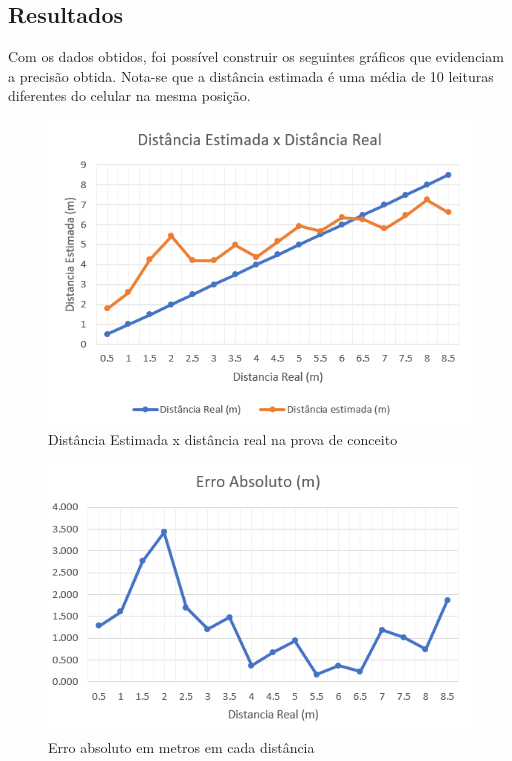 \subsection{Resultados}

Com os dados obtidos, foi possível construir os seguintes gráficos que evidenciam a precisão obtida.
Nota-se que a distância estimada é uma média de 10 leituras diferentes do celular na mesma posição.

\begin{figure}[H]
	\centering 
	\includegraphics[scale = 1]{images/grafico_distancias_1d.png}
	\caption{Distância Estimada x distância real na prova de conceito}
	\label{fig:grafico_distancia_1d}
\end{figure}

\begin{figure}[H]
	\centering 
	\includegraphics[scale = 1]{images/grafico_erro_1d.png}
	\caption{Erro absoluto em metros em cada distância}
	\label{fig:grafico_erro_1d}
\end{figure}

